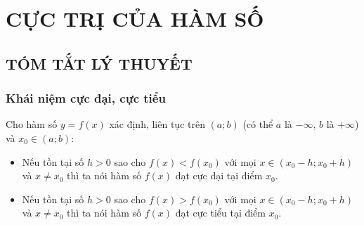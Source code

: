 \section{CỰC TRỊ CỦA HÀM SỐ}
\subsection{TÓM TẮT LÝ THUYẾT}
\subsubsection{Khái niệm cực đại, cực tiểu}
Cho hàm số $y=f(x)$ xác định, liên tục trên $(a;b)$ (có thể $a$ là $-\infty$, $b$ là $+\infty$) và $x_0\in (a;b)$:
\begin{itemize}
    \item Nếu tồn tại số $h>0$ sao cho $f(x)<f(x_0)$ với mọi $x\in \left(x_0-h;x_0+h\right)$ và $x\ne x_0$ thì ta nói hàm số $f(x)$ đạt cực đại tại điểm $x_0$.
    \item Nếu tồn tại số $h>0$ sao cho $f(x)>f(x_0)$ với mọi $x\in \left(x_0-h;x_0+h\right)$ và $x\ne x_0$ thì ta nói hàm số $f(x)$ đạt cực tiểu tại điểm $x_0$.
\end{itemize}
